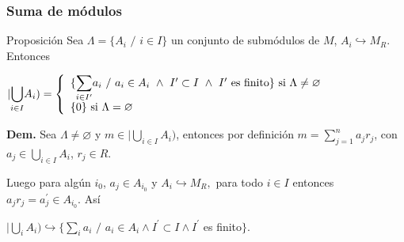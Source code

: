 \documentclass[notes=show]{beamer}%
\newenvironment{Propo}{\begin{block}{Proposición}}{\end{block}}
\begin{document}
\begin{frame}%


\bigskip%
\frametitle{Suma de módulos}%


\begin{Propo}
Sea $\Lambda=\{A_{i}$ $/$ $i\in I\}$ un conjunto de submódulos de $M$,
$A_{i}\hookrightarrow M_{R}$. Entonces

$|%
{\displaystyle\bigcup\limits_{i\in I}}
A_{i})=\left\{
\begin{array}
[c]{l}%
\{%
{\displaystyle\sum\limits_{i\in I^{\prime}}}
a_{i}\text{ }/\text{ }a_{i}\in A_{i}\text{ }\wedge\text{ }I^{\prime}\subset
I\text{ }\wedge\text{ }I^{\prime}\text{ es finito}\}\text{ si }\Lambda
\neq\varnothing\\
\{0\}\text{ si }\Lambda=\varnothing
\end{array}
\right.  $
\end{Propo}

\textbf{Dem. }Sea $\Lambda\neq\varnothing$ y $m\in|%
{\displaystyle\bigcup\limits_{i\in I}}
A_{i})$, entonces por definición $m=%
{\displaystyle\sum\limits_{j=1}^{n}}
a_{j}r_{j}$, con $a_{j}\in%
{\displaystyle\bigcup\limits_{i\in I}}
A_{i}$, $r_{j}\in R$.

\bigskip Luego para algún $i_{0}$, $a_{j}\in A_{i_{0}}$ y $A_{i}%
\hookrightarrow M_{R},$ para todo $i\in I$ entonces $a_{j}r_{j}=a_{j}^{\prime
}\in A_{i_{0}}.$ Así

$|%
{\displaystyle\bigcup\limits_{i}}
A_{i})\hookrightarrow\{%
{\displaystyle\sum\limits_{i}}
a_{i}$ $/$ $a_{i}\in A_{i}\wedge I^{\prime}\subset I\wedge I^{\prime}$ es
finito$\}.$

\bigskip%

\transboxout
\end{frame}%
\end{document}
